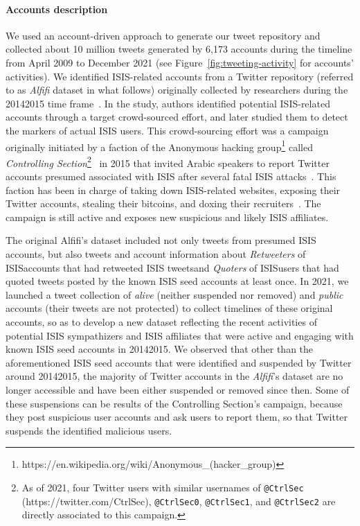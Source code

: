 \documentclass[letterpaper]{article} %
\begin{document}

\paragraph{Accounts description} We used an account-driven approach to generate our tweet repository and  collected about 10 million tweets generated  by 6,173 accounts during the timeline from April 2009 to December 2021 (see Figure~\ref{fig:tweeting-activity} for accounts' activities).  
We identified ISIS-related accounts  from a Twitter repository (referred to as \textit{Alfifi} dataset in what follows) originally collected by researchers during the 20142015 time frame~\cite{alfifi2018measuring}. In the study, authors   identified  potential ISIS-related accounts through a target crowd-sourced effort, and later studied them to detect  the markers of actual ISIS users. This crowd-sourcing effort was a campaign originally initiated by a faction of the Anonymous hacking group\footnote{https://en.wikipedia.org/wiki/Anonymous\_(hacker\_group)} called \textit{Controlling Section}\footnote{As of 2021, four Twitter users with similar usernames of \texttt{@CtrlSec} (https://twitter.com/CtrlSec), \texttt{@CtrlSec0}, \texttt{@CtrlSec1}, and \texttt{@CtrlSec2} are directly associated to this campaign.}~\cite{ctrl-sec} in 2015 that invited Arabic speakers to report Twitter accounts presumed associated  with  ISIS after several fatal ISIS attacks~\cite{anon-hacktivist}. This faction has been in charge of taking down ISIS-related websites, exposing their Twitter accounts, stealing their bitcoins, and doxing their recruiters~\cite{ctrl-sec}. The campaign is still active and exposes new suspicious and likely ISIS affiliates.  

The original Alfifi's dataset included not only tweets from presumed  ISIS  accounts, but also tweets and account information about {\em Retweeters} of ISISaccounts that had retweeted ISIS tweetsand {\em Quoters} of ISISusers that had quoted tweets posted by the known ISIS seed accounts at least once. In 2021,  we launched  a tweet collection of  \textit{alive} (neither suspended nor removed) and {\em public} accounts (their tweets are not protected) to collect timelines of these original accounts, so as to develop a new dataset reflecting the recent activities of potential ISIS sympathizers and ISIS affiliates that were active and engaging with known ISIS seed accounts in 20142015. We observed that other than the aforementioned ISIS seed accounts that were identified and suspended by Twitter around 20142015, the majority of  Twitter accounts in the \textit{Alfifi}'s dataset are no longer accessible and have been either suspended or removed since then. Some of these suspensions can be results of the Controlling Section's campaign, because they post suspicious user accounts and ask users to report them, so that Twitter suspends the identified malicious users.
 
\end{document}
